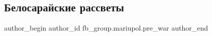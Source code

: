  
 
 
 
 

\subsection{Белосарайские рассветы}
\label{sec:06_02_2023.fb.fb_group.mariupol.pre_war.2.belosaraiskie_rassve}

\ifcmt
 author_begin
   author_id fb_group.mariupol.pre_war
 author_end
\fi
